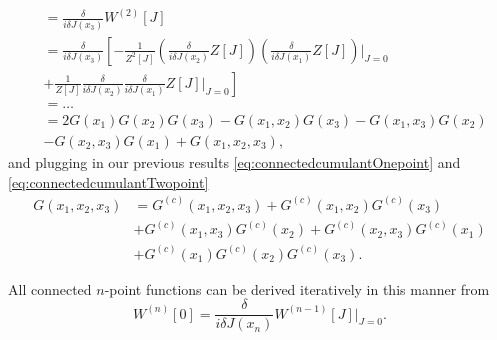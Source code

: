 \begin{enumerate}
\begin{align*}
	& = \frac{\delta}{i\delta J(x_3)} W^{(2)}[J] \\
	&= \frac{\delta}{i \delta  J(x_3)} \left[- \frac{1}{Z^2[J]} \left(\frac{\delta}{i\delta J(x_2)} Z[J]\right)\left(\frac{\delta}{i \delta J(x_1)} Z[J]\right)|_{J=0}  \right.\\
	&\left. +\frac{1}{Z[J]} \frac{\delta}{i \delta J(x_2)} \frac{\delta}{i \delta J(x_1)} Z[J] |_{J=0}  \right] \\
	&= \dots \\
	&= 2 G(x_1) G(x_2) G(x_3) - G(x_1,x_2) G(x_3) - G(x_1,x_3) G(x_2)\\
	& - G(x_2,x_3) G(x_1) + G(x_1,x_2,x_3),
\end{align*}
and plugging in our previous results \ref{eq:connectedcumulantOnepoint} and \ref{eq:connectedcumulantTwopoint}
\begin{align}
	\label{eq:connectedcumulantThreepoint}
	G(x_1,x_2,x_3) &= G^{(c)}(x_1,x_2,x_3) + G^{(c)}(x_1,x_2) G^{(c)} (x_3)\nonumber \\
	&+ G^{(c)}(x_1,x_3) G^{(c)}(x_2) + G^{(c)}(x_2,x_3) G^{(c)}(x_1)\nonumber \\
	& + G^{(c)} (x_1) G^{(c)}(x_2) G^{(c)}(x_3).
\end{align}
\end{enumerate}
All connected $n$-point functions can be derived iteratively in this manner from
\begin{equation}
	W^{(n)}[0] = \frac{\delta}{i \delta J(x_n)} W^{(n-1)}[J] |_{J=0}.
\end{equation}




